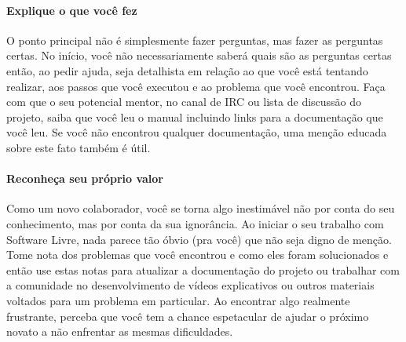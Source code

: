 \paragraph*{Explique o que você fez} O ponto principal não é simplesmente fazer perguntas,
mas fazer as perguntas certas. No início, você não necessariamente saberá quais são as
perguntas certas então, ao pedir ajuda, seja detalhista em relação ao que você está
tentando realizar, aos passos que você executou e ao problema que você encontrou.
Faça com que o seu potencial mentor, no canal de IRC ou lista de discussão do projeto,
saiba que você leu o manual incluindo links para a documentação que você leu. Se você
não encontrou qualquer documentação, uma menção educada sobre este fato também é útil.


\paragraph*{Reconheça seu próprio valor} Como um novo colaborador, você se torna
algo inestimável não por conta do seu conhecimento, mas por conta da sua ignorância.
Ao iniciar o seu trabalho com Software Livre, nada parece tão óbvio (pra você) que não
seja digno de menção. Tome nota dos problemas que você encontrou e como eles foram
solucionados e então use estas notas para atualizar a documentação do projeto ou
trabalhar com a comunidade no desenvolvimento de vídeos explicativos ou outros
materiais voltados para um problema em particular. Ao encontrar algo realmente
frustrante, perceba que você tem a chance espetacular de ajudar o próximo novato
a não enfrentar as mesmas dificuldades.
